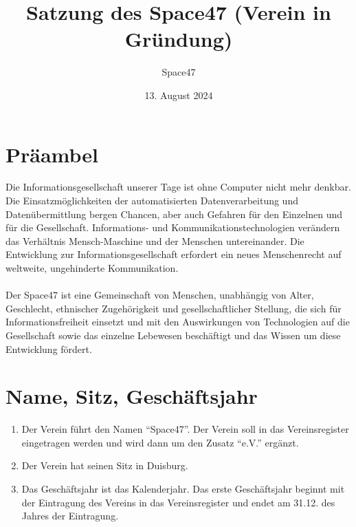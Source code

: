 \documentclass[a4paper]{article}
\title{Satzung des Space47 (Verein in Gründung)}
\author{Space47}
\date{13. August 2024}
\begin{document}
\maketitle

\renewcommand\thesection{}
\section{Präambel}

Die Informationsgesellschaft unserer Tage ist ohne Computer nicht mehr denkbar.
Die Einsatzmöglichkeiten der automatisierten Datenverarbeitung und Datenübermittlung bergen Chancen,
aber auch Gefahren für den Einzelnen und für die Gesellschaft.
Informations- und Kommunikationstechnologien verändern das Verhältnis Mensch-Maschine und der Menschen untereinander.
Die Entwicklung zur Informationsgesellschaft erfordert ein neues Menschenrecht auf weltweite, ungehinderte Kommunikation. \\ \\
Der Space47 ist eine Gemeinschaft von Menschen, unabhängig von Alter, Geschlecht, ethnischer Zugehörigkeit und
gesellschaftlicher Stellung, die sich für Informationsfreiheit einsetzt und mit den Auswirkungen von Technologien
auf die Gesellschaft sowie das einzelne Lebewesen beschäftigt und das Wissen um diese Entwicklung fördert.

\renewcommand\thesection{§ \arabic{section}}
\setcounter{section}{0}
\section{Name, Sitz, Geschäftsjahr}
\begin{enumerate}
	\item Der Verein führt den Namen \enquote{Space47}. Der Verein soll in das Vereinsregister eingetragen werden und wird dann um den Zusatz \enquote{e.V.} ergänzt.
	\item Der Verein hat seinen Sitz in Duisburg.
	\item Das Geschäftsjahr ist das Kalenderjahr. Das erste Geschäftsjahr beginnt mit der Eintragung des Vereins in das Vereinsregister und endet am 31.12. des Jahres der Eintragung.
\end{enumerate}
\end{document}
